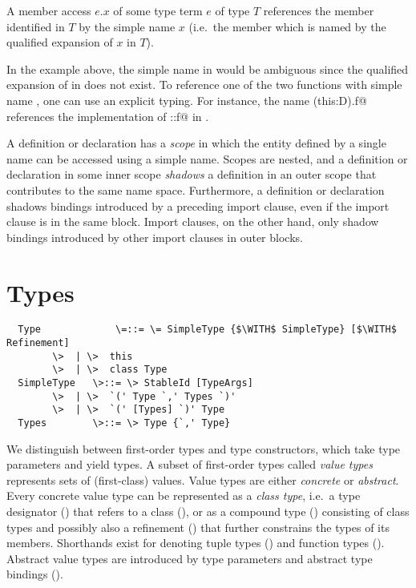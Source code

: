 \documentclass[11pt]{report}
\begin{document}
{A member access $e.x$ of some type term $e$ of type $T$ references the
member identified in $T$ by the simple name $x$ (i.e.\ the member
which is named by the qualified expansion of $x$ in $T$).

In the example above, the simple name \verb@f@ in \verb@M@ would be
ambiguous since the qualified expansion of \verb@f@ in \verb@M@ does
not exist.  To reference one of the two functions with simple name
\verb@f@, one can use an explicit typing. For instance, the name
\verb@(this:D).f@ references the implementation of \verb@D::f@ in
\verb@M@.
}

A definition or declaration has a {\em scope} in which the entity
defined by a single name can be accessed using a simple name. Scopes
are nested, and a definition or declaration in some inner scope {\em
shadows} a definition in an outer scope that contributes to the same
name space. Furthermore, a definition or declaration shadows bindings
introduced by a preceding import clause, even if the import clause is
in the same block. Import clauses, on the other hand, only shadow
bindings introduced by other import clauses in outer blocks.


\chapter{\label{sec:types}Types}

\syntax\begin{verbatim}
  Type             \=::= \= SimpleType {$\WITH$ SimpleType} [$\WITH$ Refinement]
		\>  | \>  this
		\>  | \>  class Type
  SimpleType   \>::= \> StableId [TypeArgs]
		\>  | \>  `(' Type `,' Types `)'
		\>  | \>  `(' [Types] `)' Type
  Types	       \>::= \> Type {`,' Type}
\end{verbatim}

We distinguish between first-order types and type constructors, which
take type parameters and yield types. A subset of first-order types
called {\em value types} represents sets of (first-class) values.
Value types are either {\em concrete} or {\em abstract}. Every
concrete value type can be represented as a {\em class type}, i.e.\ a
type designator () that refers to a class
(), or as a compound type
() consisting of class types and possibly
also a refinement () that further constrains the
types of its members.  Shorthands exist for denoting tuple types
() and function types
().  Abstract value types are introduced by
type parameters and abstract type bindings ().
\end{document}
